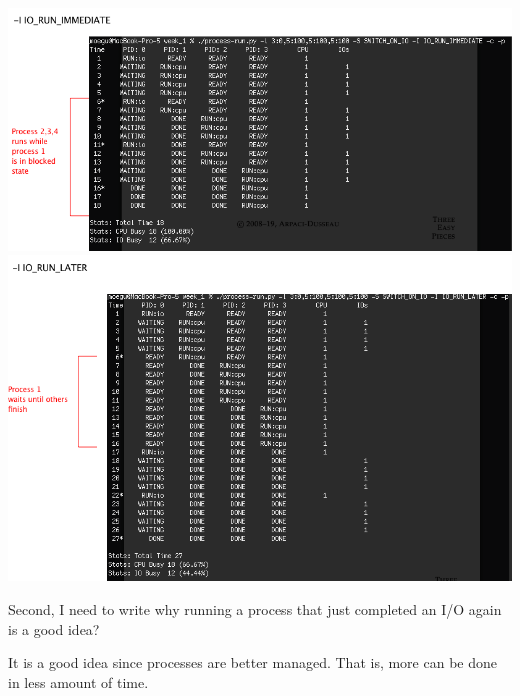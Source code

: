 \documentclass[12pt]{article}
\begin{document}
\begin{enumerate}[1.]
    \begin{center}
    \includegraphics[width=\linewidth]{images/worksheet_1_solution_5.png}
    \includegraphics[width=\linewidth]{images/worksheet_1_solution_6.png}
    \end{center}

    Second, I need to write why running a process that just completed an I/O again is
    a good idea?

    \bigskip

    It is a good idea since processes are better managed. That is, more can be done
    in less amount of time.

\end{enumerate}
\end{document}
